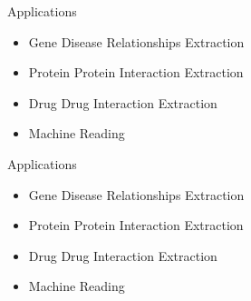 \documentclass[xcolor={dvipsnames}]{beamer}
\begin{document}
\begin{frame}{\insertsection}

\begin{exampleblock}{Applications}
		\begin{itemize}
			\item Gene Disease Relationships Extraction
			\item Protein Protein Interaction Extraction
			\item Drug Drug Interaction Extraction
			\item Machine Reading
		\end{itemize}
\end{exampleblock}
\end{frame}

\begin{frame}{\insertsection}

\begin{exampleblock}{Applications}
		\begin{itemize}
			\item Gene Disease Relationships Extraction
			\item Protein Protein Interaction Extraction
			\item \alert{Drug Drug Interaction Extraction}
			\item Machine Reading
		\end{itemize}
\end{exampleblock}
\end{frame}

\begin{frame}[fragile]{\insertsection}
\end{frame}
\end{document}
